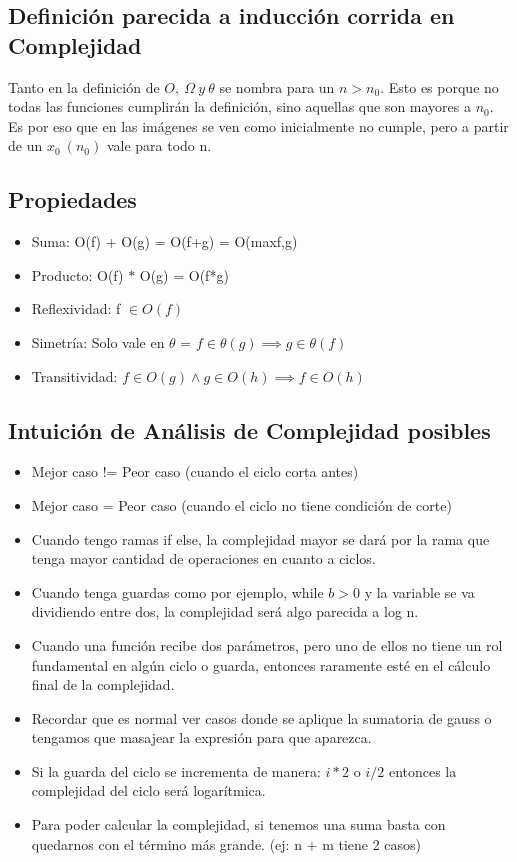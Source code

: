 \documentclass[10pt,a4paper]{article}
\begin{document}
\subsection*{Definición parecida a inducción corrida en Complejidad}
Tanto en la definición de \(O, \ \Omega \ y \ \theta\) se nombra para un \(n > n_{0}\). Esto es porque no todas las funciones cumplirán la definición, sino aquellas que son mayores a \(n_{0}\). Es por eso que en las imágenes se ven como inicialmente no cumple, pero a partir de un \(x_{0} \ (n_{0})\) vale para todo n.
\subsection*{Propiedades}
\begin{itemize}
    \item Suma: O(f) + O(g) = O(f+g) = O(max{f,g})
    \item Producto: O(f) \(\ast\) O(g) = O(f*g)
    \item Reflexividad: f \(\in O(f)\)
    \item Simetría: Solo vale en \(\theta\) = \(f \in \theta(g) \implies g \in \theta(f)\)
    \item Transitividad: \(f \in O(g) \land g \in O(h) \implies f \in O(h)\)
\end{itemize}
\subsection*{Intuición de Análisis de Complejidad posibles}
\begin{itemize}
    \item Mejor caso != Peor caso (cuando el ciclo corta antes)
    \item Mejor caso = Peor caso (cuando el ciclo no tiene condición de corte)
    \item Cuando tengo ramas if else, la complejidad mayor se dará por la rama que tenga mayor cantidad de operaciones en cuanto a ciclos.
    \item Cuando tenga guardas como por ejemplo, while $b>0$ y la variable se va dividiendo entre dos, la complejidad será algo parecida a log n.
    \item Cuando una función recibe dos parámetros, pero uno de ellos no tiene un rol fundamental en algún ciclo o guarda, entonces raramente esté en el cálculo final de la complejidad.
    \item Recordar que es normal ver casos donde se aplique la sumatoria de gauss o tengamos que masajear la expresión para que aparezca.
    \item Si la guarda del ciclo se incrementa de manera: $i*2$ o $i/2$ entonces la complejidad del ciclo será logarítmica.
    \item Para poder calcular la complejidad, si tenemos una suma basta con quedarnos con el término más grande. (ej: n + m tiene 2 casos)
\end{itemize}
\end{document}
